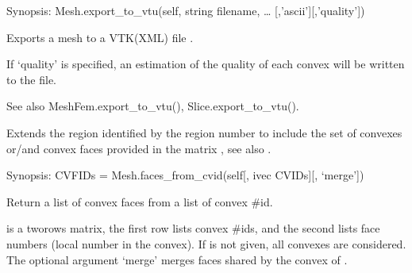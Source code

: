 \documentclass[a4paper,11pt,english]{sphinxmanual}
\begin{document}
\begin{fulllineitems}

\begin{fulllineitems}
\label{\detokenize{python/cmdref_Mesh:getfem.Mesh.export_to_vtu}}
Synopsis: Mesh.export\_to\_vtu(self, string filename, … {[},’ascii’{]}{[},’quality’{]})

Exports a mesh to a VTK(XML) file .

If ‘quality’ is specified, an estimation of the quality of each
convex will be written to the file.

See also MeshFem.export\_to\_vtu(), Slice.export\_to\_vtu().

\end{fulllineitems}


\begin{fulllineitems}
\label{\detokenize{python/cmdref_Mesh:getfem.Mesh.extend_region}}
Extends the region identified by the region number  to include
the set of convexes or/and convex faces provided in the matrix
, see also .

\end{fulllineitems}


\begin{fulllineitems}
\label{\detokenize{python/cmdref_Mesh:getfem.Mesh.faces_from_cvid}}
Synopsis: CVFIDs = Mesh.faces\_from\_cvid(self{[}, ivec CVIDs{]}{[}, ‘merge’{]})

Return a list of convex faces from a list of convex \#id.

 is a two\sphinxhyphen{}rows matrix, the first row lists convex \#ids,
and the second lists face numbers (local number in the convex).
If  is not given, all convexes are considered. The optional
argument ‘merge’ merges faces shared by the convex of .


\end{fulllineitems}
\end{fulllineitems}
\end{document}
